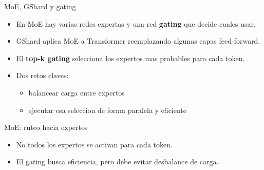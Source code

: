 \documentclass[aspectratio=169]{beamer}
\begin{document}
\begin{frame}{MoE, GShard y gating}
  \begin{itemize}
    \item En MoE hay varias redes expertas y una red \textbf{gating} que decide cuales usar.
    \item GShard aplica MoE a Transformer reemplazando algunas capas feed-forward.
    \item El \textbf{top-k gating} selecciona los expertos mas probables para cada token.
    \item Dos retos claves:
      \begin{itemize}
        \item balancear carga entre expertos
        \item ejecutar esa seleccion de forma paralela y eficiente
      \end{itemize}
  \end{itemize}
\end{frame}

\begin{frame}{MoE: ruteo hacia expertos}
  \centering
  \vspace{0.25cm}

  \begin{itemize}
    \item No todos los expertos se activan para cada token.
    \item El gating busca eficiencia, pero debe evitar desbalance de carga.
  \end{itemize}
\end{frame}
\end{document}
